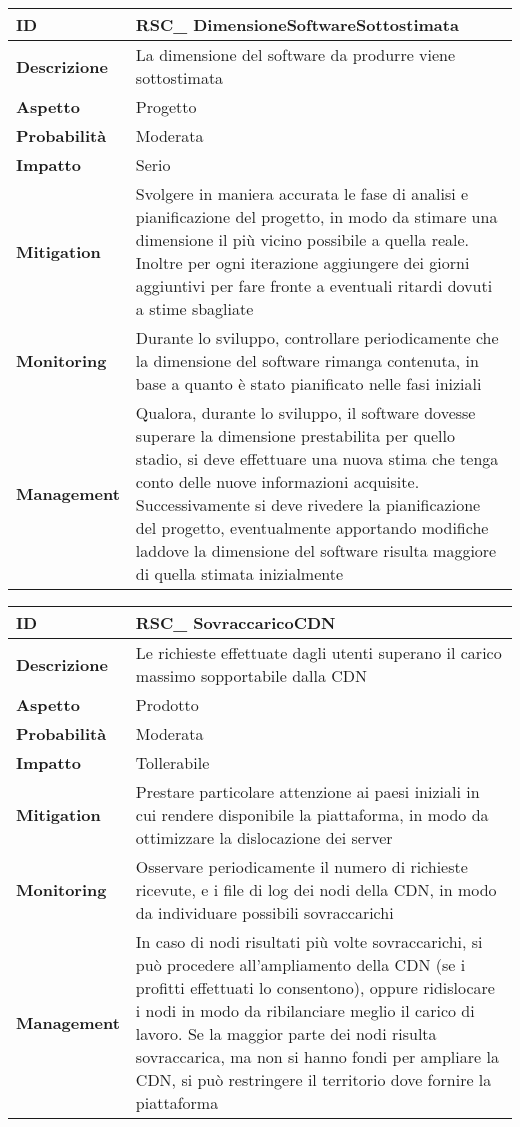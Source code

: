 \begin{tabular}{|p{2.2cm}|p{9.6cm}| }
	\hline
   \textbf{ID} & RSC\_ DimensioneSoftwareSottostimata\\ [0.5ex] 
   \hline
   \textbf{Descrizione} & La dimensione del software da produrre viene sottostimata \\ 
   \hline
   \textbf{Aspetto} &  Progetto \\
   \hline
   \textbf{Probabilità} & Moderata\\ 
   \hline
   \textbf{Impatto} & Serio\\
   \hline
   \textbf{Mitigation} & Svolgere in maniera accurata le fase di analisi e pianificazione del progetto, in modo da stimare una dimensione il più vicino possibile a quella reale. Inoltre per ogni iterazione aggiungere dei giorni aggiuntivi per fare fronte a eventuali ritardi dovuti a stime sbagliate \\ 
   \hline
   \textbf{Monitoring} & Durante lo sviluppo, controllare periodicamente che la dimensione del software rimanga contenuta, in base a quanto è stato pianificato nelle fasi iniziali\\ 
   \hline
   \textbf{Management} & Qualora, durante lo sviluppo, il software dovesse superare la dimensione prestabilita per quello stadio, si deve effettuare una nuova stima che tenga conto delle nuove informazioni acquisite. Successivamente si deve rivedere la pianificazione del progetto, eventualmente apportando modifiche laddove la dimensione del software risulta maggiore di quella stimata inizialmente \\ 
   \hline
\end{tabular}

\begin{tabular}{|p{2.2cm}|p{9.6cm}| } 
 	\hline
	 \textbf{ID} & RSC\_ SovraccaricoCDN\\ [0.5ex] 
	\hline
	\textbf{Descrizione} & Le richieste effettuate dagli utenti superano il carico massimo sopportabile dalla CDN \\ 
	\hline
   	\textbf{Aspetto} &  Prodotto \\
	\hline
	\textbf{Probabilità} &  Moderata \\ 
	\hline
	\textbf{Impatto} &  Tollerabile \\ 
	\hline
	\textbf{Mitigation} & Prestare particolare attenzione ai paesi iniziali in cui rendere disponibile la piattaforma, in modo da ottimizzare la dislocazione dei server \\ 
	\hline
	\textbf{Monitoring} & Osservare periodicamente il numero di richieste ricevute, e i file di log dei nodi della CDN, in modo da individuare possibili sovraccarichi\\ 
	\hline
	\textbf{Management} & In caso di nodi risultati più volte sovraccarichi, si può procedere all'ampliamento della CDN (se i profitti effettuati lo consentono), oppure ridislocare i nodi in modo da ribilanciare meglio il carico di lavoro. Se la maggior parte dei nodi risulta sovraccarica, ma non si hanno fondi per ampliare la CDN, si può restringere il territorio dove fornire la piattaforma\\ 
	\hline
\end{tabular}


